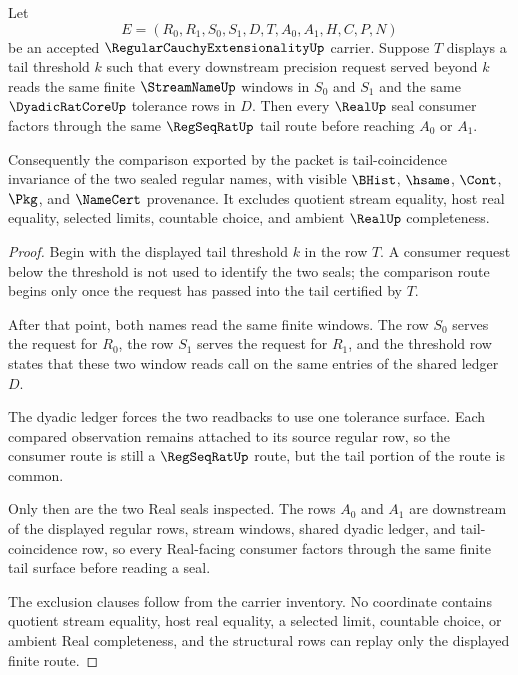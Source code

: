 \begin{theorem}
\label{thm:regular-cauchy-extensionality-tail-coincidence-seal}
Let
$$
E=(R_0,R_1,S_0,S_1,D,T,A_0,A_1,H,C,P,N)
$$
be an accepted $\RegularCauchyExtensionalityUp$ carrier. Suppose $T$ displays a tail threshold $k$ such that every downstream precision request served beyond $k$ reads the same finite $\StreamNameUp$ windows in $S_0$ and $S_1$ and the same $\DyadicRatCoreUp$ tolerance rows in $D$. Then every $\RealUp$ seal consumer factors through the same $\RegSeqRatUp$ tail route before reaching $A_0$ or $A_1$.

Consequently the comparison exported by the packet is tail-coincidence invariance of the two sealed regular names, with visible $\BHist$, $\hsame$, $\Cont$, $\Pkg$, and $\NameCert$ provenance. It excludes quotient stream equality, host real equality, selected limits, countable choice, and ambient $\RealUp$ completeness.
\end{theorem}
\begin{proof}
Begin with the displayed tail threshold $k$ in the row $T$. A consumer request below the threshold is not used to identify the two seals; the comparison route begins only once the request has passed into the tail certified by $T$.

After that point, both names read the same finite windows. The row $S_0$ serves the request for $R_0$, the row $S_1$ serves the request for $R_1$, and the threshold row states that these two window reads call on the same entries of the shared ledger $D$.

The dyadic ledger forces the two readbacks to use one tolerance surface. Each compared observation remains attached to its source regular row, so the consumer route is still a $\RegSeqRatUp$ route, but the tail portion of the route is common.

Only then are the two Real seals inspected. The rows $A_0$ and $A_1$ are downstream of the displayed regular rows, stream windows, shared dyadic ledger, and tail-coincidence row, so every Real-facing consumer factors through the same finite tail surface before reading a seal.

The exclusion clauses follow from the carrier inventory. No coordinate contains quotient stream equality, host real equality, a selected limit, countable choice, or ambient Real completeness, and the structural rows can replay only the displayed finite route.
\end{proof}

